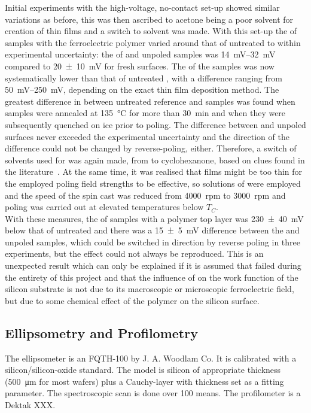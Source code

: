 Initial experiments with the high-voltage, no-contact set-up showed similar variations as before, this was then ascribed to acetone being a poor solvent for creation of \pvdf{} thin films and a switch to \dmf{} solvent was made. With this set-up the \spv{} of samples with the ferroelectric polymer varied around that of untreated \sih{} to within experimental uncertainty: the \spv{} of  and unpoled \pvdf{} samples was \SIrange{14}{32}{\milli\volt} compared to \SI{20+-10}{\milli\volt} for fresh \sih{} surfaces. The \cpd{} of the \pvdf{} samples was now systematically lower than that of untreated \sih{}, with a difference ranging from \SIrange{50}{250}{\milli\volt}, depending on the exact thin film deposition method. The greatest difference in \cpd{} between untreated reference and \pvdf{} samples was found when samples were annealed at \SI{135}{\degreeCelsius} for more than \SI{30}{\minute} and when they were subsequently quenched on ice prior to poling. The difference between  and unpoled \pvdf{} surfaces never exceeded the experimental uncertainty and the direction of the difference could not be changed by reverse-poling, either. Therefore, a switch of solvents used for \pvdf{} was again made, from \dmf{} to cyclohexanone, based on clues found in the literature~\cite{naber_cyclo}. At the same time, it was realised that \pvdf{} films might be too thin for the employed poling field strengths to be effective, so  solutions of \pvdf{} were employed and the speed of the spin cast was reduced from \SI{4000}{rpm} to \SI{3000}{rpm} and poling was carried out at elevated temperatures below $T_C$.\\
With these measures, the \cpd{} of samples with a polymer top layer was \SI{230+-40}{\milli\volt} below that of untreated \sih{} and there was a \SI{15+-5}{\milli\volt} difference between the  and unpoled \pvdf{} samples, which could be switched in direction by reverse poling in three experiments, but the effect could not always be reproduced. This is an unexpected result which can only be explained if it is assumed that  failed during the entirety of this project and that the influence of \pvdf{} on the work function of the silicon substrate is not due to its macroscopic or microscopic ferroelectric field, but due to some chemical effect of the polymer on the silicon surface.
\subsection{Ellipsometry and Profilometry}
The ellipsometer is an FQTH-100 by J. A. Woodlam Co. It is calibrated with a silicon/silicon-oxide standard. The model is silicon of appropriate thickness (\SI{500}{\micro\metre} for most wafers) plus a Cauchy-layer with thickness set as a fitting parameter. The spectroscopic scan is done over \num{100} means. The profilometer is a Dektak XXX.
